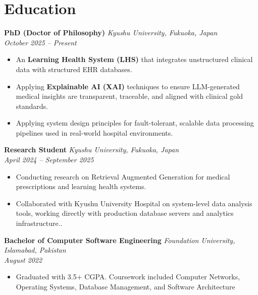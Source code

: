 \documentclass[a4paper,11pt]{article}
\begin{document}

\section*{Education}

\textbf{PhD (Doctor of Philosophy)} \hfill \textit{Kyushu University, Fukuoka, Japan} \\
\textit{October 2025 -- Present}
\begin{itemize}[leftmargin=*, noitemsep, nolistsep]
    \item An \textbf{Learning Health System (LHS)} that integrates unstructured clinical data with structured EHR databases.
    \item Applying \textbf{Explainable AI (XAI)} techniques to ensure LLM-generated medical insights are transparent, traceable, and aligned with clinical gold standards.
    \item Applying system design principles for fault-tolerant, scalable data processing pipelines used in real-world hospital environments.
\end{itemize}


\textbf{Research Student} \hfill \textit{Kyushu University, Fukuoka, Japan} \\
\textit{April 2024 -- September 2025}
\begin{itemize}[leftmargin=*, noitemsep, nolistsep]
    \item Conducting research on Retrieval Augmented Generation for medical prescriptions and learning health systems.
    \item Collaborated with Kyushu University Hospital on system-level data analysis tools, working directly with production database servers and analytics infrastructure..
\end{itemize}

\vspace{4pt}

\textbf{Bachelor of Computer Software Engineering} \hfill \textit{Foundation University, Islamabad, Pakistan} \\
\textit{August 2022}
\begin{itemize}[leftmargin=*, noitemsep, nolistsep]
    \item Graduated with 3.5+ CGPA. Coursework included Computer Networks, Operating Systems, Database Management, and Software Architecture
\end{itemize}

\end{document}
